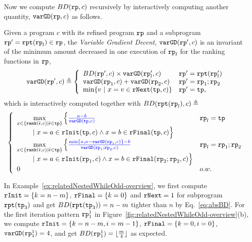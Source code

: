 Now we compute $BD(\mathtt{rp}, c)$ recursively by interactively computing another quantity, $\mathtt{varGD}(\mathtt{rp}, c)$ as follows.
\begin{defn}
\label{def:loopbound}
Given a program $c$ with its refined program $\mathtt{rp}$ and a subprogram $\mathtt{rp}' = \mathtt{rpt}(\mathtt{rp}_l) \in \mathtt{rp}$,
the \emph{Variable Gradient Decent}, 
 $\mathtt{varGD}(\mathtt{rp}', c)$ is an invariant of the minimum amount decreased in one execution of $\mathtt{rp}_l$ for the ranking functions in $\mathtt{rp}$,
{\small
\[
  \varGD(\rprog', c) \triangleq
  \left\{
   \begin{array}{ll}
    BD(\rprog', c)  \times {\varGD(\rprog_l', c)} &  \rprog' = \rprepeat(\rprog_l') \\
    \varGD(\rprog_1, c) + \varGD(\rprog_2, c) & \rprog' = \rprog_1;\rprog_2 \\
    \min\left\{v  ~|~ x = v \in \rfnext(\tpath, c) \right\}   & \rprog' = \tpath, 
    \end{array}
  \right.
 \]
 which is interactively computed together with $BD(\mathtt{rpt}(\mathtt{rp}_l), c) \triangleq$
 \[
  \left\{ 
    \begin{array}{ll}
      \max\limits_{x \in \left\{ \locbound(\absevent, c) | \absevent \in \tpath \right\}} 
      \Big\{ \highlight{\frac{a - b}{\varGD(\tpath, c)}}  &  \rprog_l = \tpath
      \\ \qquad 
      ~\vert~
      x = a \in \rfinit(\tpath, c)
      \land x = b \in \rffinal(\tpath, c)
      \Big\} 
      \\
      \max\limits_{x \in \left\{ \locbound(\absevent, c) | \absevent \in \tpath \right\}} 
      \Big\{ \highlight{\frac{\min\{ a, a - \varGD(\rprog_1, c) \} - b}{\varGD(\rprog_1;\rprog_2, c)}}  
      &  \rprog_l = \rprog_1;\rprog_2
      \\ \qquad 
      ~\vert~
      x = a \in \rfinit(\rprog_1, c)
      \land x = b \in \rffinal(\rprog_2;\rprog_2, c)
      \Big\}   \\
      0  &  o.w.
    \end{array} 
    \right.
\]
}
\end{defn}
In Example~\ref{ex:relatedNestedWhileOdd-overview}, we first compute $\mathtt{rInit} = \{k = n - m\}$, $\mathtt{rFinal} = \{k = 0\}$ and $\mathtt{rNext} = 1$ for subprogram $\mathtt{rpt}(\mathtt{tp}_3)$ and get $BD(\mathtt{rpt}(\mathtt{tp}_3)) = n - m$ tighter than $n$ by Eq.~\ref{eq:absBD}.
For the first iteration pattern $\mathtt{rp}_1^1$ in Figure~\ref{fig:relatedNestedWhileOdd-overview}(b), we compute 
$\mathtt{rInit} = \{k = n - m, i = m - 1\}$, $\mathtt{rFinal} = \{k = 0, i = 0\}$, $\mathtt{varGD}(\mathtt{rp}_1^1) = 4$, and get $BD(\mathtt{rp}_1^1) = \lfloor \frac{m}{4} \rfloor $ as expected.


